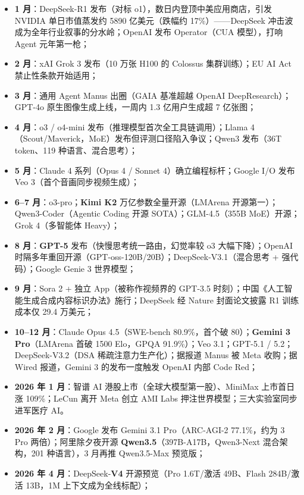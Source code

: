 \documentclass[12pt,a4paper]{article}
\begin{document}
\begin{itemize}
  \item \textbf{1 月}：DeepSeek-R1 发布（对标 o1），数日内登顶中美应用商店，引发 NVIDIA 单日市值蒸发约 5890 亿美元（跌幅约 17\%）——DeepSeek 冲击波成为全年行业叙事的分水岭；OpenAI 发布 Operator（CUA 模型），打响 Agent 元年第一枪；
  \item \textbf{2 月}：xAI Grok 3 发布（10 万张 H100 的 Colossus 集群训练）；EU AI Act 禁止性条款开始适用；
  \item \textbf{3 月}：通用 Agent Manus 出圈（GAIA 基准超越 OpenAI DeepResearch）；GPT-4o 原生图像生成上线，一周内 1.3 亿用户生成超 7 亿张图；
  \item \textbf{4 月}：o3 / o4-mini 发布（推理模型首次全工具链调用）；Llama 4（Scout/Maverick，MoE）发布但评测口径陷入争议；Qwen3 发布（36T token、119 种语言、混合思考）；
  \item \textbf{5 月}：Claude 4 系列（Opus 4 / Sonnet 4）确立编程标杆；Google I/O 发布 Veo 3（首个音画同步视频生成）；
  \item \textbf{6--7 月}：o3-pro；\textbf{Kimi K2} 万亿参数全量开源（LMArena 开源第一）；Qwen3-Coder（Agentic Coding 开源 SOTA）；GLM-4.5（355B MoE）开源；Grok 4（多智能体 Heavy）；
  \item \textbf{8 月}：\textbf{GPT-5} 发布（快慢思考统一路由，幻觉率较 o3 大幅下降）；OpenAI 时隔多年重回开源（GPT-oss-120B/20B）；DeepSeek-V3.1（混合思考 + 强代码）；Google Genie 3 世界模型；
  \item \textbf{9 月}：Sora 2 + 独立 App（被称作视频界的 GPT-3.5 时刻）；中国《人工智能生成合成内容标识办法》施行；DeepSeek 经 Nature 封面论文披露 R1 训练成本仅 29.4 万美元；
  \item \textbf{10--12 月}：Claude Opus 4.5（SWE-bench 80.9\%，首个破 80）；\textbf{Gemini 3 Pro}（LMArena 首破 1500 Elo，GPQA 91.9\%）；Veo 3.1；GPT-5.1 / 5.2；DeepSeek-V3.2（DSA 稀疏注意力生产化）；据报道 Manus 被 Meta 收购；据 Wired 报道，Gemini 3 的发布一度触发 OpenAI 内部 Code Red；
  \item \textbf{2026 年 1 月}：智谱 AI 港股上市（全球大模型第一股）、MiniMax 上市首日涨 109\%；LeCun 离开 Meta 创立 AMI Labs 押注世界模型；三大实验室同步进军医疗 AI。
  \item \textbf{2026 年 2 月}：Google 发布 Gemini 3.1 Pro（ARC-AGI-2 77.1\%，约为 3 Pro 两倍）；阿里除夕夜开源 \textbf{Qwen3.5}（397B-A17B，Qwen3-Next 混合架构，201 种语言），3 月再推 Qwen3.5-Max 预览版；
  \item \textbf{2026 年 4 月}：DeepSeek-\textbf{V4} 开源预览（Pro 1.6T/激活 49B、Flash 284B/激活 13B，1M 上下文成为全线标配）；

\end{itemize}
\end{document}
